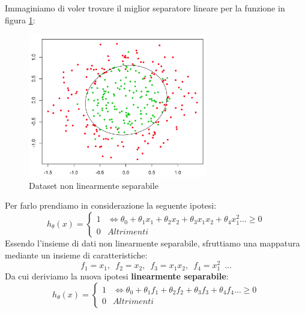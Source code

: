 \begin{esempio}
  Immaginiamo di voler trovare il miglior separatore lineare per la funzione in figura \ref{NonLinearFunction}:
  \begin{figure}[H]
    \centering
    \includegraphics[width=0.7\textwidth]{img/nonLinearFunction.png}
    \caption{Dataset non linearmente separabile}
    \label{NonLinearFunction}
\end{figure}
Per farlo prendiamo in considerazione la seguente ipotesi:
\[h_\theta(x) =
    \begin{cases}
      1& \iff \theta_0 + \theta_1x_1 + \theta_2x_2 + 
      \theta_3x_1x_2 + \theta_4x^2_1 \dots \geq 0 \\
      0& Altrimenti
    \end{cases}
  \]
  Essendo l'insieme di dati non linearmente separabile, sfruttiamo una mappatura mediante un insieme di caratteristiche:
  \[f_1 = x_1,\,\,\,f_2 = x_2,\,\,\,f_3 = x_1x_2, \,\,\, f_4 = x_1^2 \,\,\,\dots\]
  Da cui deriviamo la nuova ipotesi \textbf{linearmente separabile}:
  \[h_\theta(x) =
    \begin{cases}
      1& \iff \theta_0 + \theta_1f_1 + \theta_2f_2 + 
      \theta_3f_3 + \theta_4f_4 \dots \geq 0 \\
      0& Altrimenti
    \end{cases}
  \]
\end{esempio}
